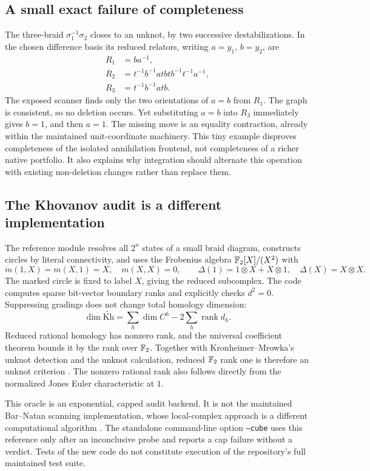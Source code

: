 \documentclass[11pt]{article}
\theoremstyle{definition}\newtheorem{definition}[theorem]{Definition}
\theoremstyle{remark}\newtheorem{remark}[theorem]{Remark}
\newcommand{\Kh}{\widetilde{\mathrm{Kh}}}
\newcommand{\code}[1]{\texttt{#1}}
\begin{document}
\subsection{A small exact failure of completeness}
The three-braid $\sigma_1^{-1}\sigma_2$ closes to an unknot, by two
successive destabilizations. In the chosen difference basis its reduced
relators, writing $a=y_1$, $b=y_2$, are
\begin{align*}
 R_1&=ba^{-1},\\
 R_2&=t^{-1}b^{-1}atbtb^{-1}t^{-1}a^{-1},\\
 R_3&=t^{-1}b^{-1}atb.
\end{align*}
The exposed scanner finds only the two orientations of $a=b$ from $R_1$.
The graph is consistent, so no deletion occurs. Yet substituting $a=b$
into $R_3$ immediately gives $b=1$, and then $a=1$. The missing move is
an equality contraction, already within the maintained unit-coordinate
machinery. This tiny example disproves completeness of the isolated
annihilation frontend, not completeness of a richer native portfolio.
It also explains why integration should alternate this operation with
existing non-deletion changes rather than replace them.

\subsection{The Khovanov audit is a different implementation}
The reference module resolves all $2^n$ states of a small braid diagram,
constructs circles by literal connectivity, and uses the Frobenius algebra
$\mathbb F_2[X]/(X^2)$ with
\[
 m(1,X)=m(X,1)=X,\quad m(X,X)=0,
 \qquad \Delta(1)=1\otimes X+X\otimes1,\quad
 \Delta(X)=X\otimes X.
\]
The marked circle is fixed to label $X$, giving the reduced subcomplex.
The code computes sparse bit-vector boundary ranks and explicitly checks
$d^2=0$. Suppressing gradings does not change total homology dimension:
\[
 \dim\Kh=\sum_h\dim C^h-2\sum_h\operatorname{rank}d_h.
\]
Reduced rational homology has nonzero rank, and the universal coefficient
theorem bounds it by the rank over $\mathbb F_2$. Together with
Kronheimer--Mrowka's unknot detection and the unknot calculation, reduced
$\mathbb F_2$ rank one is therefore an unknot criterion \cite{KM}. The nonzero
rational rank also follows directly from the normalized Jones Euler
characteristic at $1$.

This oracle is an exponential, capped audit backend. It is not the
maintained Bar--Natan scanning implementation, whose local-complex
approach is a different computational algorithm \cite{BN}. The
standalone command-line option \code{--cube} uses this reference only
after an inconclusive probe and reports a cap failure without a verdict.
Tests of the new code do not constitute execution of the repository's
full maintained test suite.
\end{document}

